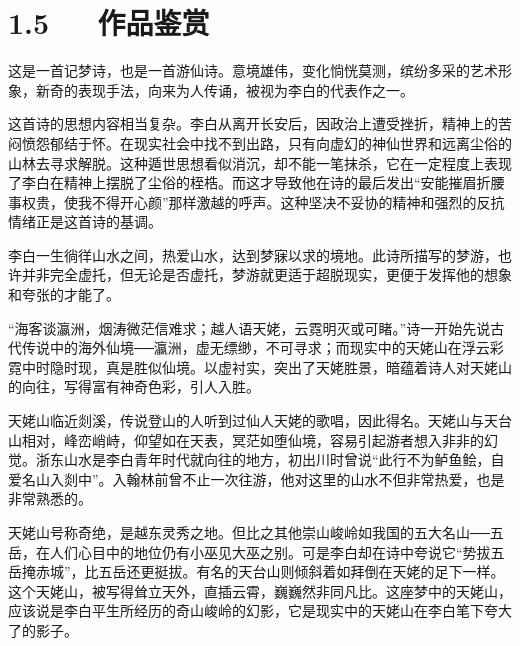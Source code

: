 \documentclass[letterpaper,10pt,english]{sphinxmanual}
\begin{document}
\section{1.5   作品鉴赏}
\label{\detokenize{p01_u6563_u6587/_u674e_u767d-_u68a6_u6e38_u5929_u59e5_u541f_u7559_u522b:id7}}
这是一首记梦诗，也是一首游仙诗。意境雄伟，变化惝恍莫测，缤纷多采的艺术形象，新奇的表现手法，向来为人传诵，被视为李白的代表作之一。

这首诗的思想内容相当复杂。李白从离开长安后，因政治上遭受挫折，精神上的苦闷愤怨郁结于怀。在现实社会中找不到出路，只有向虚幻的神仙世界和远离尘俗的山林去寻求解脱。这种遁世思想看似消沉，却不能一笔抹杀，它在一定程度上表现了李白在精神上摆脱了尘俗的桎梏。而这才导致他在诗的最后发出“安能摧眉折腰事权贵，使我不得开心颜”那样激越的呼声。这种坚决不妥协的精神和强烈的反抗情绪正是这首诗的基调。

李白一生徜徉山水之间，热爱山水，达到梦寐以求的境地。此诗所描写的梦游，也许并非完全虚托，但无论是否虚托，梦游就更适于超脱现实，更便于发挥他的想象和夸张的才能了。

“海客谈瀛洲，烟涛微茫信难求；越人语天姥，云霓明灭或可睹。”诗一开始先说古代传说中的海外仙境──瀛洲，虚无缥缈，不可寻求；而现实中的天姥山在浮云彩霓中时隐时现，真是胜似仙境。以虚衬实，突出了天姥胜景，暗蕴着诗人对天姥山的向往，写得富有神奇色彩，引人入胜。

天姥山临近剡溪，传说登山的人听到过仙人天姥的歌唱，因此得名。天姥山与天台山相对，峰峦峭峙，仰望如在天表，冥茫如堕仙境，容易引起游者想入非非的幻觉。浙东山水是李白青年时代就向往的地方，初出川时曾说“此行不为鲈鱼鲙，自爱名山入剡中”。入翰林前曾不止一次往游，他对这里的山水不但非常热爱，也是非常熟悉的。

天姥山号称奇绝，是越东灵秀之地。但比之其他崇山峻岭如我国的五大名山──五岳，在人们心目中的地位仍有小巫见大巫之别。可是李白却在诗中夸说它“势拔五岳掩赤城”，比五岳还更挺拔。有名的天台山则倾斜着如拜倒在天姥的足下一样。这个天姥山，被写得耸立天外，直插云霄，巍巍然非同凡比。这座梦中的天姥山，应该说是李白平生所经历的奇山峻岭的幻影，它是现实中的天姥山在李白笔下夸大了的影子。
\end{document}
